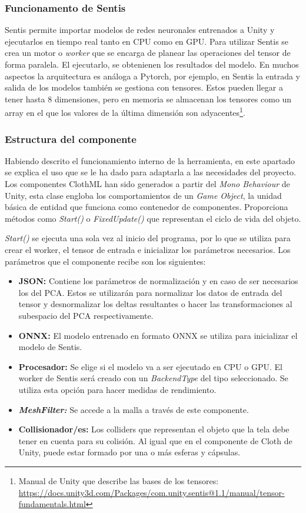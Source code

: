 \subsubsection{Funcionamento de Sentis}
Sentis permite importar modelos de redes neuronales entrenados a Unity y ejecutarlos en tiempo real tanto en CPU como en GPU. Para utilizar Sentis se crea un motor o \textit{worker} que se encarga de planear las operaciones del tensor de forma paralela. El ejecutarlo, se obtenienen los resultados del modelo. En muchos aspectos la arquitectura es análoga a Pytorch, por ejemplo, en Sentis la entrada y salida de los modelos también se gestiona con tensores. Estos pueden llegar a tener hasta 8 dimensiones, pero en memoria se almacenan los tensores como un array en el que los valores de la última dimensión son adyacentes\footnote{Manual de Unity que describe las bases de los tensores: \url{https://docs.unity3d.com/Packages/com.unity.sentis@1.1/manual/tensor-fundamentals.html}}. 

\subsubsection{Estructura del componente}
Habiendo descrito el funcionamiento interno de la herramienta, en este apartado se explica el uso que se le ha dado para adaptarla a las necesidades del proyecto. Los componentes ClothML han sido generados a partir del \textit{Mono Behaviour} de Unity, esta clase engloba los comportamientos de un \textit{Game Object}, la unidad básica de entidad que funciona como contenedor de componentes. Proporciona métodos como \textit{Start()} o \textit{FixedUpdate()} que representan el ciclo de vida del objeto.\newline

\textit{Start()} se ejecuta una sola vez al inicio del programa, por lo que se utiliza para crear el worker, el tensor de entrada e inicializar los parámetros necesarios. Los parámetros que el componente recibe son los siguientes:
\begin{itemize}
    \item \textbf{JSON:} Contiene los parámetros de normalización y en caso de ser necesarios los del PCA. Estos se utilizarán para normalizar los datos de entrada del tensor y desnormalizar los deltas resultantes o hacer las transformaciones al subespacio del PCA respectivamente.
    \item \textbf{ONNX:} El modelo entrenado en formato ONNX se utiliza para inicializar el modelo de Sentis.
    \item \textbf{Procesador:} Se elige si el modelo va a ser ejecutado en CPU o GPU. El worker de Sentis será creado con un \textit{BackendType} del tipo seleccionado. Se utiliza esta opción para hacer medidas de rendimiento.
    \item \textbf{\textit{MeshFilter:}} Se accede a la malla a través de este componente.
    \item \textbf{Collisionador/es:} Los colliders que representan el objeto que la tela debe tener en cuenta para su colisión. Al igual que en el componente de Cloth de Unity, puede estar formado por una o más esferas y cápsulas.
\end{itemize}

